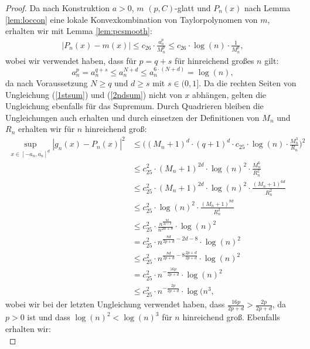 \begin{proof}
Da nach Konstruktion $a > 0$, $m$ $(p, C)$-glatt und $P_n(x)$ nach Lemma \ref{lem:loccon} eine lokale Konvexkombination von Taylorpolynomen von $m$, erhalten wir mit Lemma \ref{lem:pcsmooth}:
\begin{equation}
\label{2ndsum}
\begin{split}
|P_n(x) - m(x)| \leq c_{26} \cdot \frac{a_n^p}{M_n^p} \leq c_{26} \cdot \log(n) \cdot \frac{1}{M_n^p} , 
\end{split}
\end{equation}
wobei wir verwendet haben, dass für $p = q + s$ für hinreichend großes $n$ gilt:
$$a_n^p = a_n^{q + s} \leq a_n^{N + d} \leq a_n^{6 \cdot (N + d)} = \log(n),$$
da nach Voraussetzung $N \geq q$ und $d \geq s$ mit $s \in (0, 1]$.
Da die rechten Seiten von Ungleichung (\ref{1stsum}) und (\ref{2ndsum}) nicht von $x$ abhängen, gelten die Ungleichung ebenfalls für das Supremum. Durch Quadrieren bleiben die Ungleichungen auch erhalten und durch einsetzen der Definitionen von $M_n$ und $R_n$ erhalten wir für $n$ hinreichend groß:
\begin{equation}
\begin{split}
\sup_{x \in [-a_n, a_n]^d} |g_n(x) - P_n(x)|^2 & \leq \bigg((M_n + 1)^d \cdot (q + 1)^d \cdot c_{25}\cdot \log(n) \cdot \frac{M_n^3}{R_n}\bigg)^2 \\
& \leq c_{25}^2 \cdot (M_n + 1)^{2d} \cdot \log(n)^2 \cdot \frac{M_n^6}{R_n^2} \\
& \leq  c_{25}^2 \cdot (M_n + 1)^{2d} \cdot \log(n)^2 \cdot \frac{(M_n + 1)^{6d}}{R_n^2} \\
& \leq  c_{25}^2 \cdot \log(n)^2 \cdot \frac{(M_n + 1)^{8d}}{R_n^2} \\
& \leq c_{25}^2 \cdot \frac{n^{\frac{8d}{2p + d}}}{n^{2d + 8}} \cdot \log(n)^2 \\
& = c_{25}^2 \cdot n^{\frac{8d}{2p + d} - 2d -8} \cdot \log(n)^2 \\
& \leq c_{25}^2 \cdot n^{\frac{8d}{2p + d}  -8\frac{2p + d}{2p + d}} \cdot \log(n)^2 \\
& = c_{25}^2 \cdot n^{-\frac{16p}{2p + d}} \cdot \log(n)^2 \\
& \leq c_{25}^2 \cdot n^{-\frac{2p}{2p + d}} \cdot \log(n^3,
\end{split}
\end{equation}
wobei wir bei der letzten Ungleichung verwendet haben, dass $\frac{16p}{2p + d} > \frac{2p}{2p + d}$, da $p > 0$ ist und dass $\log(n)^2 < \log(n)^3$ für $n$ hinreichend groß. Ebenfalls erhalten wir:
\begin{equation}

\end{equation}
\end{proof}

